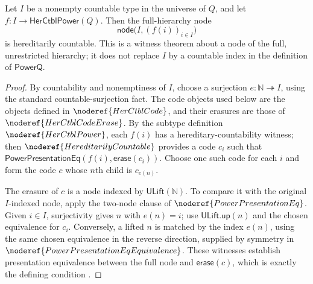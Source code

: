 \begin{lemma}
Let $I$ be a nonempty countable type in the universe of $Q$, and let
$f:I\to\mathsf{HerCtblPower}(Q)$.  Then the full-hierarchy node
\[
\mathsf{node}\bigl(I,(f(i))_{i\in I}\bigr)
\]
is hereditarily countable.  This is a witness theorem about a node of the
full, unrestricted hierarchy; it does not replace $I$ by a countable index
in the definition of $\mathsf{PowerQ}$.
\end{lemma}
\begin{proof}
By countability and nonemptiness of $I$, choose a surjection
$e:\mathbb N\twoheadrightarrow I$, using the standard countable-surjection
fact.  The code objects used below are the objects defined in
$\noderef{HerCtblCode}$, and their erasures are those of
$\noderef{HerCtblCodeErase}$.  By the subtype definition
$\noderef{HerCtblPower}$, each $f(i)$ has a hereditary-countability witness;
then $\noderef{HereditarilyCountable}$ provides a code $c_i$ such that
$\mathsf{PowerPresentationEq}(f(i),\mathsf{erase}(c_i))$.  Choose one such
code for each $i$ and form the code $c$ whose $n$th child is $c_{e(n)}$.

The erasure of $c$ is a node indexed by $\mathsf{ULift}(\mathbb N)$.
To compare it with the original $I$-indexed node, apply the two-node
clause of $\noderef{PowerPresentationEq}$.  Given $i\in I$, surjectivity
gives $n$ with $e(n)=i$; use $\mathsf{ULift.up}(n)$ and the chosen
equivalence for $c_i$.  Conversely, a lifted $n$ is matched by the index
$e(n)$, using the same chosen equivalence in the reverse direction, supplied
by symmetry in $\noderef{PowerPresentationEqEquivalence}$.  These witnesses
establish presentation equivalence between the full node and
$\mathsf{erase}(c)$, which is exactly the defining condition
.
\end{proof}
